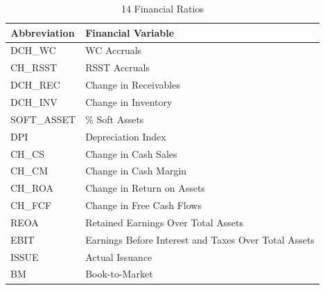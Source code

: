 \documentclass[conference]{IEEEtran}
\begin{document}
\vspace{10pt}
\begin{table}[htbp]
\caption{14 Financial Ratios}
\centering
\begin{tabular}{@{}p{2.3cm}p{6.1cm}@{}} 
\toprule
\textbf{\hspace{5mm}Abbreviation} & \textbf{Financial Variable\hspace{5mm}} \\
\midrule
\hspace{5mm}DCH\_WC & WC Accruals\hspace{3mm} \\
\hspace{5mm}CH\_RSST & RSST Accruals\hspace{3mm} \\
\hspace{5mm}DCH\_REC & Change in Receivables\hspace{5mm} \\
\hspace{5mm}DCH\_INV & Change in Inventory\hspace{5mm} \\
\hspace{5mm}SOFT\_ASSET & \% Soft Assets \hspace{5mm} \\
\hspace{5mm}DPI & Depreciation Index\hspace{5mm} \\
\hspace{5mm}CH\_CS & Change in Cash Sales\hspace{5mm} \\
\hspace{5mm}CH\_CM & Change in Cash Margin\hspace{5mm} \\
\hspace{5mm}CH\_ROA & Change in Return on Assets\hspace{5mm} \\
\hspace{5mm}CH\_FCF & Change in Free Cash Flows\hspace{5mm} \\
\hspace{5mm}REOA & Retained Earnings Over Total Assets\hspace{5mm} \\
\hspace{5mm}EBIT & Earnings Before Interest and Taxes Over Total Assets \\
\hspace{5mm}ISSUE & Actual Issuance\hspace{5mm} \\
\hspace{5mm}BM & Book-to-Market\hspace{5mm} \\
\bottomrule
\end{tabular}
\label{tab1}
\end{table} \vspace{10pt}
\end{document}
